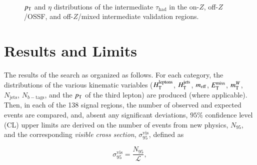 \begin{figure}[tbp]
  \hfill
   \\
  \caption{$p_{\text{T}}$ and $\eta$ distributions of the intermediate $\tau_{\mathrm{had}}$ in the on-$Z$, off-$Z$/OSSF, and off-$Z$/mixed intermediate validation regions. }
  \label{fig:model-independent-VR-intermediate-tau}
\end{figure}


\section{Results and Limits}\label{sec:model-independent-results}
The results of the search as organized as follows. For each category, the distributions of the various kinematic variables ($H_{\mathrm{T}}^{\mathrm{leptons}}$, $H_{\mathrm{T}}^{\mathrm{jets}}$, $m_{\mathrm{eff}}$, $E_{\text{T}}^{\text{miss}}$, $m_{\mathrm{T}}^W$, $N_{\mathrm{jets}}$, $N_{b-\mathrm{tags}}$, and the $p_{\text{T}}$ of the third lepton) are produced (where applicable). Then, in each of the 138 signal regions, the number of observed and expected events are compared, and, absent any significant deviations, $95\%$ confidence level (CL) upper limits are derived on the number of events from new physics, $N_{95}$, and the corresponding \emph{visible cross section}, $\sigma_{95}^{\mathrm{vis}}$, defined as

\begin{equation}
	\sigma_{95}^{\mathrm{vis}} = \frac{N_{95}}{\mathcal{L}},
\end{equation}

